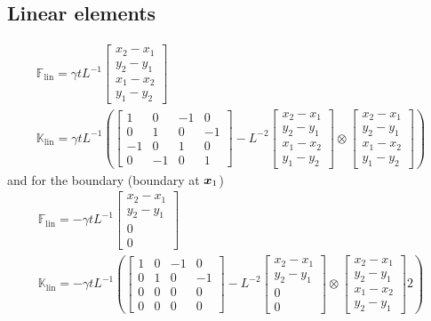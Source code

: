 \documentclass[a4paper,11pt]{article}
\renewcommand{\to}[1]{\text{\boldmath $#1$}} %
\newcommand{\uv}[1]{\mathds{#1}}
\newcommand{\um}[1]{\mathds{#1}}
\newcommand{\linear}{\mathrm{lin}}
\begin{document}
\subsection{Linear elements}
\begin{gather}
 \uv F_\linear = \gamma t L^{-1} \begin{bmatrix}x_2-x_1\\y_2-y_1\\x_1-x_2\\y_1-y_2\end{bmatrix}\\
 \um K_\linear = \gamma t L^{-1}\left(
	\begin{bmatrix}1&0&-1&0\\0&1&0&-1\\-1&0&1&0\\0&-1&0&1\end{bmatrix}-
	L^{-2}\begin{bmatrix}x_2-x_1\\y_2-y_1\\x_1-x_2\\y_1-y_2\end{bmatrix}\otimes\begin{bmatrix}x_2-x_1\\y_2-y_1\\x_1-x_2\\y_1-y_2\end{bmatrix}
  \right)
\end{gather}
and for the boundary (boundary at $\to x_1$)
\begin{gather}
 \uv F_\linear = -\gamma t L^{-1} \begin{bmatrix}x_2-x_1\\y_2-y_1\\0\\0\end{bmatrix}\\
 \um K_\linear = -\gamma t L^{-1} \left(\begin{bmatrix}1&0&-1&0\\0&1&0&-1\\0&0&0&0\\0&0&0&0\end{bmatrix} - L^{-2} \begin{bmatrix}x_2-x_1\\y_2-y_1\\0\\0\end{bmatrix}\otimes\begin{bmatrix}x_2-x_1\\y_2-y_1\\x_1-x_2\\y_2-y_1\end{bmatrix}2\right)\\
\end{gather}
\end{document}
